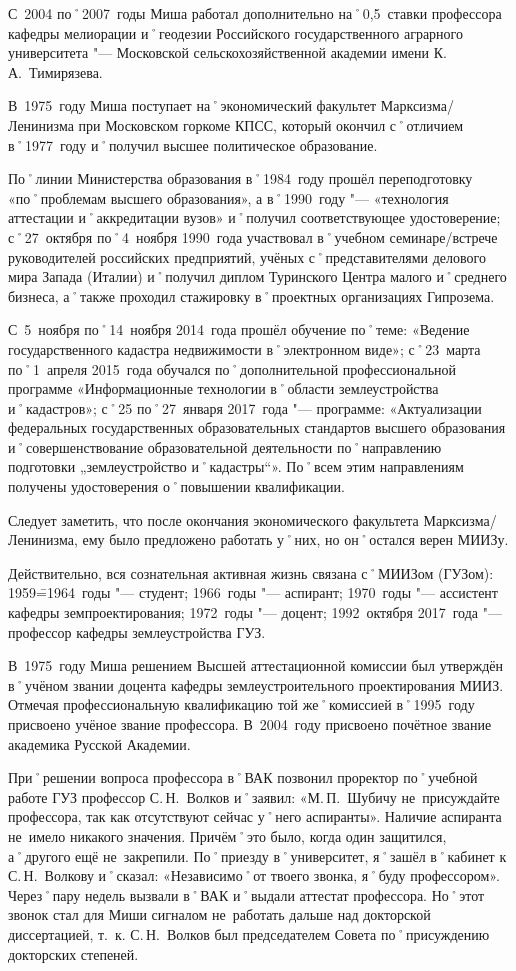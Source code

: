 С~2004 по˚2007~годы Миша работал дополнительно на˚0,5~ставки профессора кафедры мелиорации и˚геодезии Российского государственного аграрного университета "--- Московской сельскохозяйственной академии имени К.\,А.~Тимирязева.

В~1975~году Миша поступает на˚экономический факультет Марксизма\-/Ленинизма при Московском горкоме КПСС, который окончил с˚отличием в˚1977~году и˚получил высшее политическое образование.

По˚линии Министерства образования в˚1984~году прошёл переподготовку «по˚проблемам высшего образования», а в˚1990~году "--- «технология аттестации и˚аккредитации вузов» и˚получил соответствующее удостоверение; с˚27~октября по˚4~ноября 1990~года участвовал в˚учебном семинаре\-/встрече руководителей российских предприятий, учёных с˚представителями делового мира Запада (Италии) и˚получил диплом Туринского Центра малого и˚среднего бизнеса, а˚также проходил стажировку в˚проектных организациях Гипрозема.

С~5~ноября по˚14~ноября 2014~года прошёл обучение по˚теме: «Ведение государственного кадастра недвижимости в˚электронном виде»; с˚23~марта по˚1~апреля 2015~года обучался по˚дополнительной профессиональной программе «Информационные технологии в˚области землеустройства и˚кадастров»; с˚25 по˚27~января 2017~года "--- программе: «Актуализации федеральных государственных образовательных стандартов высшего образования и˚совершенствование образовательной деятельности по˚направлению подготовки „землеустройство и˚кадастры“». По˚всем этим направлениям получены удостоверения о˚повышении квалификации. 

Следует заметить, что после окончания экономического факультета Марксизма\-/Ленинизма, ему было предложено работать у˚них, но он˚остался верен МИИЗу.

Действительно, вся сознательная активная жизнь связана с˚МИИЗом (ГУЗом): 1959\==1964~годы "--- студент; 1966~годы "--- аспирант; 1970~годы "--- ассистент кафедры земпроектирования; 1972~годы "--- доцент; 1992~октября 2017~года "--- профессор кафедры землеустройства ГУЗ.

В~1975~году Миша решением Высшей аттестационной комиссии был утверждён в˚учёном звании доцента кафедры землеустроительного проектирования МИИЗ. Отмечая профессиональную квалификацию той же˚комиссией в˚1995~году присвоено учёное звание профессора. В~2004~году присвоено почётное звание академика Русской Академии.

При˚решении вопроса профессора в˚ВАК позвонил проректор по˚учебной работе ГУЗ профессор С.\,Н.~Волков и˚заявил: «М.\,П.~Шубичу не~присуждайте профессора, так как отсутствуют сейчас у˚него аспиранты». Наличие аспиранта не~имело никакого значения. Причём˚это было, когда один защитился, а˚другого ещё не~закрепили. По˚приезду в˚университет, я˚зашёл в˚кабинет к С.\,Н.~Волкову и˚сказал: «Независимо˚от твоего звонка, я˚буду профессором». Через˚пару недель вызвали в˚ВАК и˚выдали аттестат профессора. Но˚этот звонок стал для Миши сигналом не~работать дальше над докторской диссертацией, т.~к. С.\,Н.~Волков был председателем Совета по˚присуждению докторских степеней.

